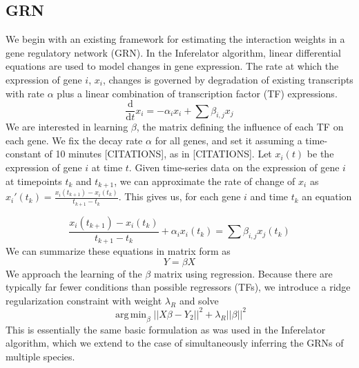 \documentclass[11pt]{article}
\DeclareMathOperator*{\argmin}{arg\,min}
\begin{document}
\subsection{GRN}
We begin with an existing framework for estimating the interaction weights in a gene regulatory network (GRN). In the Inferelator algorithm, linear differential equations are used to model changes in gene expression. The rate at which the expression of gene $i$, $x_i$, changes is governed by degradation of existing transcripts with rate $\alpha$ plus a linear combination of transcription factor (TF) expressions.
\begin{equation}
\frac{\mathrm d}{\mathrm d t} x_i = -\alpha_{i}x_{i} + \sum \beta_{i,j}x_{j}
\end{equation}
We are interested in learning $\beta$, the matrix defining the influence of each TF on each gene. We fix the decay rate $\alpha$ for all genes, and set it assuming a time-constant of 10 minutes [CITATIONS], as in [CITATIONS]. Let $x_i(t)$ be the expression of gene $i$ at time $t$. Given time-series data on the expression of gene $i$ at timepoints $t_k$ and $t_{k+1}$, we can approximate the rate of change of $x_i$ as $x_i'(t_k)=\frac{x_i(t_{k+1})-x_i(t_k)}{t_{k+1}-t_k}$. This gives us, for each gene $i$ and time $t_{k}$ an equation

\begin{equation}
\frac{x_i(t_{k+1})-x_i(t_k)}{t_{k+1}-t_k} + \alpha_{i}x_{i}(t_k)= \sum \beta_{i,j}x_{j}(t_k)
\end{equation}
\noindent We can summarize these equations in matrix form as
\begin{equation}
Y = \beta X
\end{equation}
\noindent We approach the learning of the $\beta$ matrix using regression. Because there are typically far fewer conditions than possible regressors (TFs), we introduce a ridge regularization constraint with weight $\lambda_R$ and solve
\begin{equation}
\argmin_\beta\vert \vert X\beta - Y_2 \vert \vert ^2 + \lambda_R \vert \vert \beta \vert \vert ^2
\end{equation}
This is essentially the same basic formulation as was used in the Inferelator algorithm, which we extend to the case of simultaneously inferring the GRNs of multiple species. 
\end{document}
